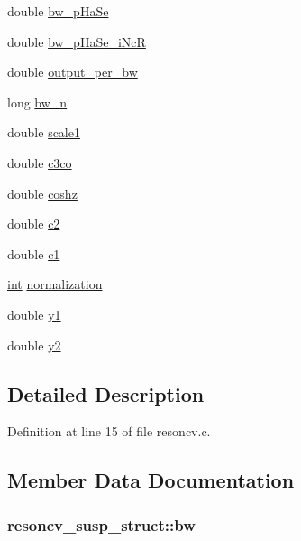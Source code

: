 \begin{DoxyCompactItemize}
\item 
double \hyperlink{structresoncv__susp__struct_a8ffc9a91c9275c25359e0c22c4a8e525}{bw\+\_\+p\+Ha\+Se}
\item 
double \hyperlink{structresoncv__susp__struct_a280955fc73e0043e9fae8925ddd203d5}{bw\+\_\+p\+Ha\+Se\+\_\+i\+NcR}
\item 
double \hyperlink{structresoncv__susp__struct_a5ef941d15ba9e7bb4ad984f10cb1f2da}{output\+\_\+per\+\_\+bw}
\item 
long \hyperlink{structresoncv__susp__struct_a8a7fa39d04b0853ba31f4123524c0357}{bw\+\_\+n}
\item 
double \hyperlink{structresoncv__susp__struct_aff019aa0fa5e5042fff7593aa359d55b}{scale1}
\item 
double \hyperlink{structresoncv__susp__struct_a8ddc7f8ebc7d4bd8e5e21efdc4415f52}{c3co}
\item 
double \hyperlink{structresoncv__susp__struct_ac6b49502e913e68dcf0d40401c69cd22}{coshz}
\item 
double \hyperlink{structresoncv__susp__struct_af82481b48e39adfa43c312a476d4f7b7}{c2}
\item 
double \hyperlink{structresoncv__susp__struct_a1e550c4ea40d487febddc4a4409c70bc}{c1}
\item 
\hyperlink{xmltok_8h_a5a0d4a5641ce434f1d23533f2b2e6653}{int} \hyperlink{structresoncv__susp__struct_afd968b4500cac87c0b4bd10e566b7c2b}{normalization}
\item 
double \hyperlink{structresoncv__susp__struct_abbfe410987be28fd8d043aff9adb1026}{y1}
\item 
double \hyperlink{structresoncv__susp__struct_a86f89bc00ee0386b9011e707ef997348}{y2}
\end{DoxyCompactItemize}


\subsection{Detailed Description}


Definition at line 15 of file resoncv.\+c.



\subsection{Member Data Documentation}
\subsubsection[{\texorpdfstring{bw}{bw}}]{ resoncv\+\_\+susp\+\_\+struct\+::bw}\hypertarget{structresoncv__susp__struct_aad00b789b4b54c0ae213122ded46f75e}{}\label{structresoncv__susp__struct_aad00b789b4b54c0ae213122ded46f75e}


